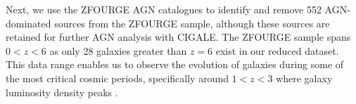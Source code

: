 Next, we use the ZFOURGE AGN catalogues \citep{cowley_zfourge_2016} to identify and remove 552 AGN-dominated sources from the ZFOURGE sample, although these sources are retained for further AGN analysis with CIGALE. The ZFOURGE sample spans $0<z<6$ as only 28 galaxies greater than $z=6$ exist in our reduced dataset. This data range enables us to observe the evolution of galaxies during some of the most critical cosmic periods, specifically around $1 < z < 3$ \citep{gruppioni_modelling_2011, wylezalek_galaxy_2014} where galaxy luminosity density peaks \citep{assef_mid-ir-_2011}. 


